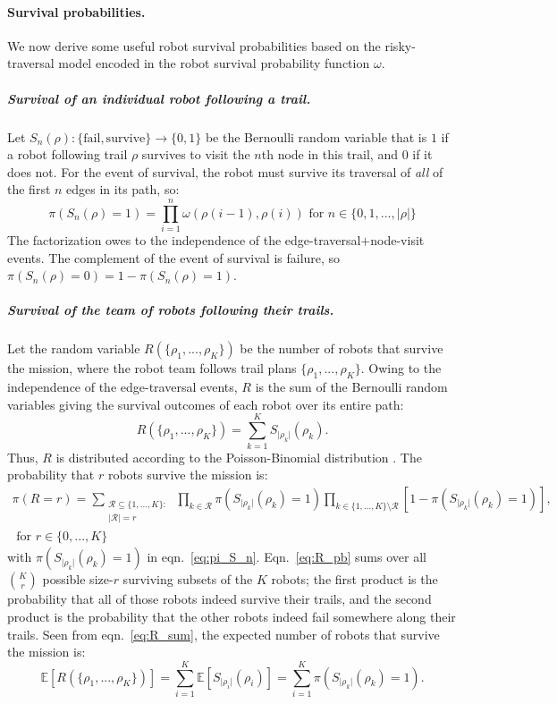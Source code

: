 \documentclass[11pt, oneside]{article}
\begin{document}
\paragraph{Survival probabilities.} 
We now derive some useful robot survival probabilities based on the risky-traversal model encoded in the robot survival probability function $\omega$.

\subparagraph{Survival of an individual robot following a trail.}
Let $S_n(\rho) : \{\text{fail}, \text{survive}\} \rightarrow \{0, 1\} $ be the Bernoulli random variable that is $1$ if a robot following trail $\rho$ survives to visit the $n$th node in this trail, and $0$ if it does not. For the event of survival, the robot must survive its traversal of \emph{all} of the first $n$ edges in its path, so:
\begin{equation}
	\pi(S_n(\rho) = 1) = \prod_{i=1}^n \omega(\rho(i-1), \rho(i)) \text{ for } n\in \{0, 1, ..., \lvert \rho \rvert\} \label{eq:pi_S_n}
\end{equation} The factorization owes to the independence of the edge-traversal$+$node-visit events.
The complement of the event of survival is failure, so $\pi(S_n(\rho) = 0)=1-\pi(S_n(\rho) = 1)$.

\subparagraph{Survival of the team of robots following their trails.}
Let the random variable $R(\{\rho_1, ..., \rho_K\})$ be the number of robots that survive the mission, where the robot team follows trail plans $\{\rho_1, ..., \rho_K\}$. Owing to the independence of the edge-traversal events, $R$ is the sum of the Bernoulli random variables giving the survival outcomes of each robot over its entire path:
\begin{equation}
	R(\{\rho_1, ..., \rho_K\})=\sum_{k=1}^K S_{\lvert \rho_k \rvert}(\rho_k). \label{eq:R_sum}
\end{equation}
Thus, $R$ is distributed according to the Poisson-Binomial distribution \cite{tang2023poisson}.
The probability that $r$ robots survive the mission is:
\begin{multline}
	\pi(R=r) = \sum_{\substack{\mathcal{R} \subseteq \{1, ..., K\} :  \\ \lvert \mathcal{R} \rvert = r} } \,
	\prod_{k \in \mathcal{R}} \pi(S_{\lvert \rho_k \rvert}(\rho_k) = 1)
	\prod_{k \in \{1, ..., K\} \setminus \mathcal{R}} [1- \pi(S_{\lvert \rho_k \rvert}(\rho_k) = 1)], \\ \text{ for } r \in \{0, ..., K\}
	\label{eq:R_pb}
\end{multline} with $ \pi(S_{\lvert \rho_k \rvert}(\rho_k) = 1)$ in eqn.~\ref{eq:pi_S_n}.
Eqn.~\ref{eq:R_pb} sums over all $\binom{K}{r}$ possible size-$r$ surviving subsets of the $K$ robots; the first product is the probability that all of those robots indeed survive their trails, and the second product is the probability that the other robots indeed fail somewhere along their trails.
Seen from eqn.~\ref{eq:R_sum}, the expected number of robots that survive the mission is:
\begin{equation}
	\mathbb{E}[R(\{\rho_1, ..., \rho_K\})]=\sum_{i=1}^K \mathbb{E}[S_{\lvert \rho_i \rvert}(\rho_i)] = \sum_{i=1}^K  \pi(S_{\lvert \rho_k \rvert}(\rho_k) = 1).
\end{equation}
\end{document}
